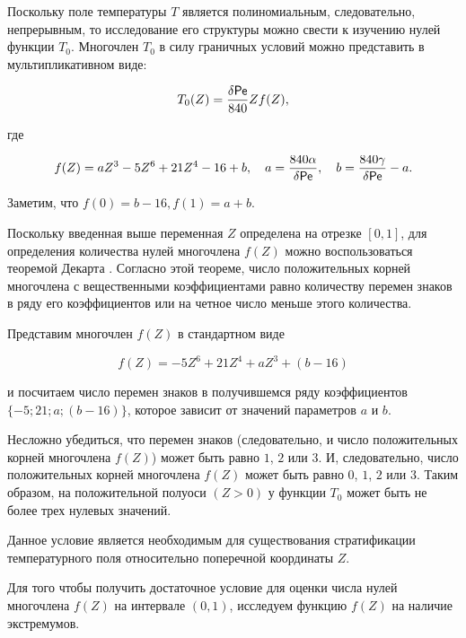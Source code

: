  \label{sec:analiz-T-rassloen}

Поскольку поле температуры $T$ является полиномиальным, следовательно, непрерывным, то исследование его структуры можно свести к изучению нулей функции $T_0$. Многочлен $T_0$ в силу граничных условий можно представить в мультипликативном виде:

$$T_0(Z)=\displaystyle \frac{\delta {\sf Pe}}{840} Z f(Z),$$

где 

\begin{equation}

f(Z)=aZ^3-5Z^6+21Z^4-16+b, \quad a=\displaystyle \frac{840\alpha}{\delta {\sf Pe}}, \quad  b=\displaystyle \frac{840\gamma}{\delta {\sf Pe}}-a.

\label{sec:f(Z)}

\end{equation}

Заметим, что $f(0)=b-16, f(1)=a+b$.



Поскольку введенная выше переменная $Z$ определена на отрезке $[0, 1]$, для определения количества нулей многочлена $f(Z)$ можно воспользоваться теоремой Декарта \cite{Dekart}. Согласно этой теореме, число положительных корней многочлена с вещественными коэффициентами равно количеству перемен знаков в ряду его коэффициентов или на четное число меньше этого количества.



Представим многочлен $f(Z)$ в стандартном виде

$$f(Z)=-5Z^6+21Z^4+aZ^3+(b-16)$$

и посчитаем число перемен знаков в получившемся ряду коэффициентов $\{-5; 21; a; (b-16)\}$, которое зависит от значений параметров $a$ и $b$. 

Несложно убедиться, что перемен знаков (следовательно, и число положительных корней многочлена $f(Z)$) может быть равно $1$, $2$ или $3$. И, следовательно, число положительных корней многочлена $f(Z)$ может быть равно $0$, $1$, $2$ или $3$. Таким образом, на положительной полуоси $( Z>0 )$ у функции $T_0$ может быть не более трех нулевых значений. 

Данное условие является необходимым для существования стратификации температурного поля относительно поперечной координаты $Z$.



Для того чтобы получить достаточное условие для оценки числа нулей многочлена $f(Z)$ на интервале $(0, 1)$, исследуем функцию $f(Z)$ на наличие экстремумов. 

